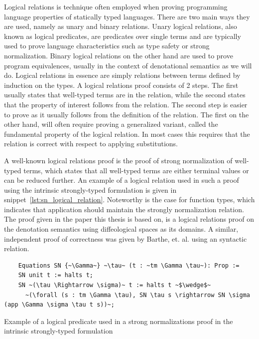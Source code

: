 \documentclass[12pt, final]{article}
\begin{document}
Logical relations is technique often employed when proving programming language properties of statically typed languages\cite{skorstengaard2019introduction}. There are two main ways they are used, namely as unary and binary relations.
Unary logical relations, also known as logical predicates, are predicates over single terms and are typically used to prove language characteristics such as type safety or strong normalization.
Binary logical relations on the other hand are used to prove program equivalences, usually in the context of denotational semantics as we will do.
Logical relations in essence are simply relations between terms defined by induction on the types. A logical relations proof consists of 2 steps.
The first usually states that well-typed terms are in the relation, while the second states that the property of interest follows from the relation.
The second step is easier to prove as it usually follows from the definition of the relation. The first on the other hand, will often require proving a generalized variant, called the fundamental property of the logical relation.
In most cases this requires that the relation is correct with respect to applying substitutions.

A well-known logical relations proof is the proof of strong normalization of well-typed terms, which states that all well-typed terms are either terminal values or can be reduced further.
An example of a logical relation used in such a proof using the intrinsic strongly-typed formulation is given in snippet~\ref{lst:sn_logical_relation}.
Noteworthy is the case for function types, which indicates that application should maintain the strongly normalization relation.
The proof given in the paper this thesis is based on, is a logical relations proof on the denotation semantics using diffeological spaces as its domains\cite{huot2020correctness}.
A similar, independent proof of correctness was given by Barthe, et. al.\cite{barthe2020versatility} using an syntactic relation.

\begin{listing}
  \begin{verbatim}
    Equations SN {~\Gamma~} ~\tau~ (t : ~tm \Gamma \tau~): Prop :=
    SN unit t := halts t;
    SN ~(\tau \Rightarrow \sigma)~ t := halts t ~$\wedge$~
      ~(\forall (s : tm \Gamma \tau), SN \tau s \rightarrow SN \sigma (app \Gamma \sigma \tau t s))~;
  \end{verbatim}
  \caption{Example of a logical predicate used in a strong normalizations proof in the intrinsic strongly-typed formulation}
  \label{lst:sn_logical_relation}
\end{listing}
\end{document}
